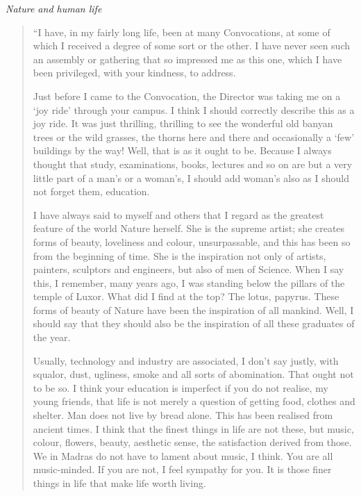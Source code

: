 \medskip
\noindent
{\em Nature and human life}
\begin{quote}
{\fontsize{10pt}{12pt}\selectfont
``I have, in my fairly long life, been at many Convocations, at some of which I received a degree of some sort or the other. I have never seen such an assembly or gathering that so impressed me as this one, which I have been privileged, with your kindness, to address.

Just before I came to the Convocation, the Director was taking me on a `joy ride' through your campus. I think I should correctly describe this as a joy ride. It was just thrilling, thrilling to see the wonderful old banyan trees or the wild grasses, the thorns here and there and occasionally a `few' buildings by the way! Well, that is as it ought to be. Because I always thought that study, examinations, books, lectures and so on are but a very little part of a man's or a woman's, I should add woman's also as I should not forget them, education.

I have always said to myself and others that I regard as the greatest feature of the world Nature herself. She is the supreme artist; she creates forms of beauty, loveliness and colour, unsurpassable, and this has been so from the beginning of time. She is the inspiration not only of artists, painters, sculptors and engineers, but also of men of Science. When I say this, I remember, many years ago, I was standing below the pillars of the temple of Luxor. What did I find at the top? The lotus, papyrus. These forms of beauty of Nature have been the inspiration of all mankind. Well, I should say that they should also be the inspiration of all these graduates of the year.

Usually, technology and industry are associated, I don't say justly, with squalor, dust, ugliness, smoke and all sorts of abomination. That ought not to be so. I think your education is imperfect if you do not realise, my young friends, that life is not merely a question of getting food, clothes and shelter. Man does not live by bread alone. This has been realised from ancient times. I think that the finest things in life are not these, but music, colour, flowers, beauty, aesthetic sense, the satisfaction derived from those. We in Madras do not have to lament about music, I think. You are all music-minded. If you are not, I feel sympathy for you. It is those finer things in life that make life worth living.

\newpage

}
\end{quote}
